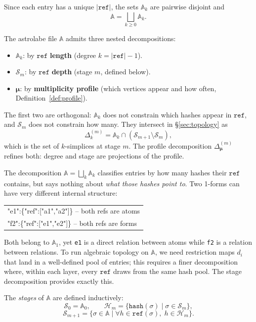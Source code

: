 Since each entry has a unique $|\texttt{ref}|$, the sets $\mathbb{A}_k$ are pairwise disjoint and
\[
\mathbb{A} = \bigsqcup_{k \geq 0} \mathbb{A}_k.
\]

\begin{remark}
\label{rem:orthogonal}
The astrolabe file $\mathbb{A}$ admits three nested decompositions:
\begin{itemize}
\item $\mathbb{A}_k$: by $\texttt{ref}$ \textbf{length} (degree $k = |\texttt{ref}| - 1$).
\item $\mathcal{S}_m$: by $\texttt{ref}$ \textbf{depth} (stage $m$, defined below).
\item $\boldsymbol{\mu}$: by \textbf{multiplicity profile} (which vertices appear and how often, Definition~\ref{def:profile}).
\end{itemize}
The first two are orthogonal: $\mathbb{A}_k$ does not constrain which hashes appear in $\texttt{ref}$, and $\mathcal{S}_m$ does not constrain how many. They intersect in \S\ref{sec:topology} as
\[
\Delta^{(m)}_k = \mathbb{A}_k \cap (\mathcal{S}_{m+1} \setminus \mathcal{S}_m),
\]
which is the set of $k$-simplices at stage $m$. The profile decomposition $\Delta^{(m)}_{\boldsymbol{\mu}}$ refines both: degree and stage are projections of the profile.
\end{remark}

The decomposition $\mathbb{A} = \bigsqcup_k \mathbb{A}_k$ classifies entries by how many hashes their $\texttt{ref}$ contains, but says nothing about \emph{what those hashes point to}. Two 1-forms can have very different internal structure:

{\small\ttfamily
\begin{tabular}{@{}l@{}}
"e1":\{"ref":["a1","a2"]\} \quad -- both refs are atoms\\
"f2":\{"ref":["e1","e2"]\} \quad -- both refs are forms
\end{tabular}
}

\noindent Both belong to $\mathbb{A}_1$, yet \texttt{e1} is a direct relation between atoms while \texttt{f2} is a relation between relations. To run algebraic topology on $\mathbb{A}$, we need restriction maps $d_i$ that land in a well-defined pool of entries; this requires a finer decomposition where, within each layer, every $\texttt{ref}$ draws from the same hash pool. The stage decomposition provides exactly this.

\begin{definition}
\label{def:stage}
The \emph{stages} of $\mathbb{A}$ are defined inductively:
\[
\mathcal{S}_0 = \mathbb{A}_0, \qquad
\mathcal{H}_m = \bigl\{\texttt{hash}(\sigma) \;\big|\; \sigma \in \mathcal{S}_m\bigr\},
\]
\[
\mathcal{S}_{m+1} = \bigl\{\sigma \in \mathbb{A} \;\big|\; \forall h \in \texttt{ref}(\sigma),\; h \in \mathcal{H}_m\bigr\}.
\]
\end{definition}

